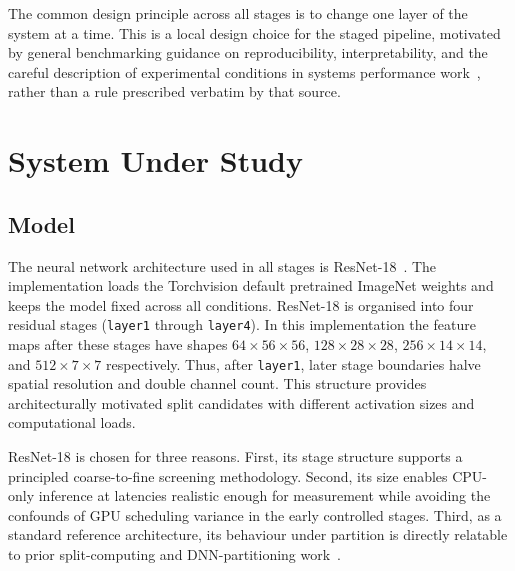 The common design principle across all stages is to change one layer of the system at a
time. This is a local design choice for the staged pipeline, motivated by general
benchmarking guidance on reproducibility, interpretability, and the careful description
of experimental conditions in systems performance work~\cite{benchmarking_sc15}, rather
than a rule prescribed verbatim by that source.

\section{System Under Study}
\label{sec:methods-system}

\subsection{Model}

The neural network architecture used in all stages is ResNet-18~\cite{resnet}.
The implementation loads the Torchvision default pretrained ImageNet weights and keeps
the model fixed across all conditions.
ResNet-18 is organised into four residual stages (\texttt{layer1} through
\texttt{layer4}).
In this implementation the feature maps after these stages have shapes
$64 \times 56 \times 56$, $128 \times 28 \times 28$,
$256 \times 14 \times 14$, and $512 \times 7 \times 7$ respectively.
Thus, after \texttt{layer1}, later stage boundaries halve spatial resolution and
double channel count.
This structure provides architecturally motivated split candidates with different
activation sizes and computational loads.

ResNet-18 is chosen for three reasons.
First, its stage structure supports a principled coarse-to-fine screening methodology.
Second, its size enables CPU-only inference at latencies realistic enough for measurement
while avoiding the confounds of GPU scheduling variance in the early controlled stages.
Third, as a standard reference architecture, its behaviour under partition is directly
relatable to prior split-computing and DNN-partitioning work~\cite{neurosurgeon,deeperthings,survey_partitioning}.

